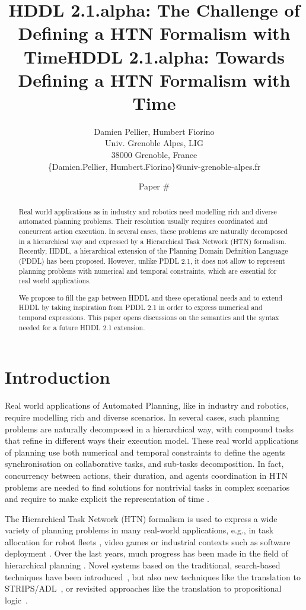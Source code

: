 \documentclass[letterpaper]{article} %
\title{HDDL 2.1.alpha: The Challenge of Defining a HTN Formalism with Time}
\author{
Damien Pellier, Humbert Fiorino\\
Univ. Grenoble Alpes, LIG\\
38000 Grenoble, France\\
\{Damien.Pellier, Humbert.Fiorino\}@univ-grenoble-alpes.fr}
\title{HDDL 2.1.alpha: Towards Defining a HTN Formalism with Time}
\author{Paper \#}
\begin{document}
\maketitle

\begin{abstract}
Real world applications as in industry and robotics need modelling rich and diverse automated planning problems. Their resolution usually requires coordinated and concurrent action execution. In several cases, these problems are naturally decomposed in a hierarchical way and expressed by a Hierarchical Task Network (HTN) formalism. Recently, HDDL, a hierarchical extension of the Planning Domain Definition Language (PDDL) has been proposed. However, unlike PDDL 2.1, it does not allow to represent planning problems with numerical and temporal constraints, which are essential for real world applications.

We propose to fill the gap between HDDL and these operational needs and to extend HDDL by taking inspiration from  PDDL 2.1 in order to express numerical and temporal expressions. This paper opens discussions on the semantics and the syntax needed for a future HDDL 2.1 extension.
\end{abstract}

\section{Introduction}

Real world applications of Automated Planning, like in industry and robotics, require modelling rich and diverse scenarios.
In several cases, such  planning problems are naturally decomposed in a hierarchical way, with compound tasks that refine in different ways their execution model.
These real world applications of planning use both numerical and temporal constraints to define the agents synchronisation on collaborative tasks, and sub-tasks decomposition. In fact, concurrency between actions, their duration, and agents coordination in HTN problems are needed to find solutions for nontrivial tasks in complex scenarios and require to make explicit the representation of time \citep{ghallabnautraverso2016}.

The Hierarchical Task Network (HTN) formalism \citep{erol94} is used to express a wide variety of planning problems in many real-world applications, e.g., in task allocation for robot fleets \citep{Milot21}, video games \citep{Menif14} or industrial contexts such as software deployment \citep{Georgievski17}. Over the last years, much progress has been made in the field of hierarchical planning \citep{bercher19}. Novel systems based on the traditional, search-based techniques have been introduced~\citep{Bit-Monnot:16,ramoul17,Shivashankar17,Bercher17,Holler19,holler20,Holler21}, but also new techniques like the translation to STRIPS/ADL~\citep{Alford09,Alford16,behnke2022}, or revisited approaches like the translation to propositional logic~\citep{behnke2018totsat,Behnke2019orderchaos,Schreiber2019SAT,Schreiber21,behnke2021}.
\end{document}
